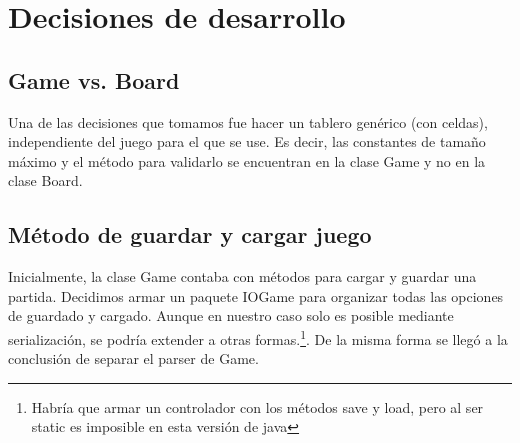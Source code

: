 \documentclass[a4paper, 11pt]{article}
\begin{document}
\section{Decisiones de desarrollo} 
	\subsection{Game vs. Board}
		Una de las decisiones que tomamos fue hacer un tablero genérico (con celdas), independiente del juego para el que se use. Es decir, las constantes de tamaño máximo y el método para validarlo se encuentran en la clase Game y no en la clase Board.
		
	\subsection{Método de guardar y cargar juego}
		Inicialmente, la clase Game contaba con métodos para cargar y guardar una partida. Decidimos armar un paquete IOGame para organizar todas las opciones de guardado y cargado. Aunque en nuestro caso solo es posible mediante serialización, se podría extender a otras formas.\footnote{Habría que armar un controlador con los métodos save y load, pero al ser static es imposible en esta versión de java}. De la misma forma se llegó a la conclusión de separar el parser de Game.
		
\end{document}
